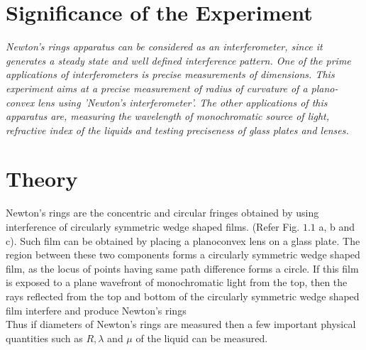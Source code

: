 \documentclass[11pt]{article}
\begin{document}
	\section{Significance of the Experiment}
	\textit{Newton's rings apparatus can be considered as an interferometer, since it generates a steady state and well defined interference pattern. One of the prime applications of interferometers is precise measurements of dimensions. This experiment aims at a precise measurement of radius of curvature of a plano-convex lens using 'Newton's interferometer'. The other applications of this apparatus are, measuring the wavelength of monochromatic source of light, refractive index of the liquids and testing preciseness of glass plates and lenses.}
	
	
	\section{Theory}
	Newton's rings are the concentric and circular fringes obtained by using interference of circularly symmetric wedge shaped films. (Refer Fig. $1.1$ a, b and c). Such film can be obtained by placing a planoconvex lens on a glass plate. The region between these two components forms a circularly symmetric wedge shaped film, as the locus of points having same path difference forms a circle. If this film is exposed to a plane wavefront of monochromatic light from the top, then the rays reflected from the top and bottom of the circularly symmetric wedge shaped film interfere and produce Newton's rings\\
	
	Thus if diameters of Newton's rings are measured then a few important physical quantities such as $R, \lambda$ and $\mu$ of the liquid can be measured.\\
	
\end{document}
